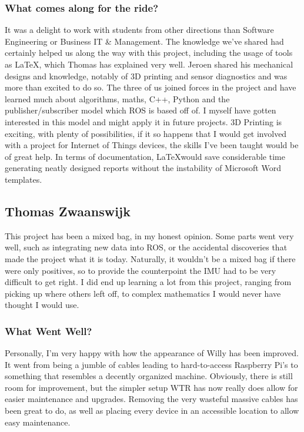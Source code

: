 \subsubsection{What comes along for the ride?}
It was a delight to work with students from other directions than Software Engineering or Business IT \& Management. 
The knowledge we've shared had certainly helped us along the way with this project, including the usage of tools as \LaTeX, which Thomas has explained very well. 
Jeroen shared his mechanical designs and knowledge, notably of 3D printing and sensor diagnostics and was more than excited to do so.
The three of us joined forces in the project and have learned much about algorithms, maths, C++, Python and the publisher/subscriber model which ROS is based off of.
I myself have gotten interested in this model and might apply it in future projects.
3D Printing is exciting, with plenty of possibilities, if it so happens that I would get involved with a project for Internet of Things devices, the skills I've been taught would be of great help.
In terms of documentation, \LaTeX would save considerable time generating neatly designed reports without the instability of Microsoft Word templates.


\newpage

\subsection{Thomas Zwaanswijk}
This project has been a mixed bag, in my honest opinion.
Some parts went very well, such as integrating new data into ROS, or the accidental discoveries that made the project what it is today.
Naturally, it wouldn't be a mixed bag if there were only positives, so to provide the counterpoint the IMU had to be very difficult to get right.
I did end up learning a lot from this project, ranging from picking up where others left off, to complex mathematics I would never have thought I would use.

\subsubsection{What Went Well?}
Personally, I'm very happy with how the appearance of Willy has been improved.
It went from being a jumble of cables leading to hard-to-access Raspberry Pi's to something that resembles a decently organized machine.
Obviously, there is still room for improvement, but the simpler setup WTR has now really does allow for easier maintenance and upgrades.
Removing the very wasteful massive cables has been great to do, as well as placing every device in an accessible location to allow easy maintenance.

